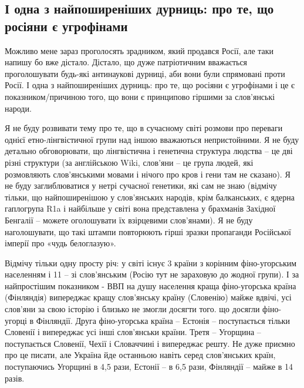  
 
 
 
 

\subsection{І одна з найпоширеніших дурниць: про те, що росіяни є угрофінами}
\label{sec:05_04_2021.fb.kalyta_taras.1.ugrofinny_rossia}

Можливо мене зараз проголосять зрадником, який продався Росії, але таки напишу
бо вже дістало. Дістало, що дуже патріотичним вважається проголошувати будь-які
антинаукові дурниці, аби вони були спрямовані проти Росії. І одна з
найпоширеніших дурниць: про те, що росіяни є угрофінами і це є
показником/причиною того, що вони є принципово гіршими за слов’янські народи.

Я не буду розвивати тему про те, що в сучасному світі розмови про переваги
однієї етно-лінгвістичної групи над іншою вважаються непристойними. Я не буду
детально обговорювати, що лінгвістична і генетична структура людства – це дві
різні структури (за англійською Wiki, слов’яни – це група людей, які
розмовляють слов’янськими мовами і нічого про кров і гени там не сказано). Я не
буду заглиблюватися у нетрі сучасної генетики, які сам не знаю (відмічу тільки,
що найпоширенішою у слов’янських народів, крім балканських, є ядерна гаплогрупа
R1a і найбільше у світі вона представлена у брахманів Західної Бенгалії –
можете оголошувати їх взірцевими слов’янами). Я не буду наголошувати, що такі
штампи повторюють гірші зразки пропаганди Російської імперії про «чудь
белоглазую».

Відмічу тільки одну просту річ: у світі існує 3 країни з корінним
фіно-угорським населенням і 11 – зі слов’янським (Росію тут не зараховую до
жодної групи). І за найпростішим показником - ВВП на душу населення краща
фіно-угорська країна (Фінляндія) випереджає кращу слов’янську країну (Словенію)
майже вдвічі, усі слов’яни за свою історію і близько не змогли досягти того. що
досягли фіно-угорці в Фінляндії. Друга фіно-угорська країна – Естонія –
поступається тільки Словенії і випереджає усі інші слов’янськи країни. Третя –
Угорщина – поступається Словенії, Чехії і Словаччині і випереджає решту. Не
дуже приємно про це писати,  але Україна йде останньою навіть серед
слов’янських країн, поступаючись Угорщині в 4,5 рази, Естонії – в 6,5 рази,
Фінляндії – майже в 14 разів.

